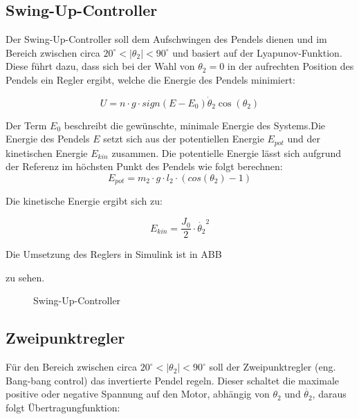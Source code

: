 \subsection{Swing-Up-Controller}
\label{Swing-Up-Controller} 

Der Swing-Up-Controller soll dem Aufschwingen des Pendels dienen und im Bereich zwischen circa $20^\circ < \left| \theta_2 \right| < 90^\circ$  und basiert auf der Lyapunov-Funktion. Diese führt dazu, dass sich bei der Wahl von
$ \theta_2 = 0$ in der aufrechten Position des Pendels ein Regler ergibt, welche die Energie des Pendels minimiert:

\begin{equation}
U = n \cdot g \cdot sign(E-E_0)\dot{\theta}_2\cos(\theta_2)
\end{equation}

Der Term $E_0$ beschreibt die gewünschte, minimale Energie des Systems.Die Energie des Pendels $E$ setzt sich aus der potentiellen Energie $E_{pot}$ und der kinetischen Energie $E_{kin}$ zusammen. Die potentielle Energie lässt sich aufgrund der Referenz im höchsten Punkt des Pendels wie folgt berechnen:
\begin{equation}
E_{pot} = m_2 \cdot g \cdot l_2 \cdot (cos(\theta_2)-1)
\end{equation}

Die kinetische Energie ergibt sich zu:

\begin{equation}
E_{kin} = \frac{J_0}{2} \cdot \dot{\theta_2}^2
\end{equation}

Die Umsetzung des Reglers in Simulink ist in ABB %

zu sehen. 

\begin{figure}[h!]
  \caption{Swing-Up-Controller}
  \centering
\end{figure}


\subsection{Zweipunktregler}
\label{zweipunktregler} 

Für den Bereich zwischen circa $20^\circ < \left| \theta_2 \right| < 90^\circ$ soll der Zweipunktregler (eng. Bang-bang control) das invertierte Pendel regeln. Dieser schaltet die maximale positive oder negative Spannung auf den Motor, abhängig von $ \theta_2 $ und $ \dot{\theta_2} $, daraus folgt  Übertragungfunktion:

